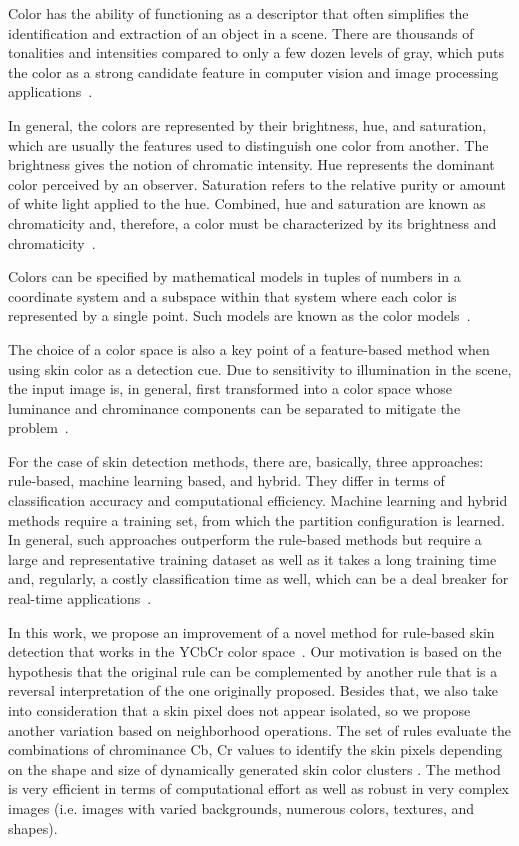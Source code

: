 Color has the ability of functioning as a descriptor that often simplifies the identification and extraction of an object in a scene. There are thousands of tonalities and intensities compared to only a few dozen levels of gray, which puts the color as a strong candidate feature in computer vision and image processing applications~\citep{gonzalez:02}.

In general, the colors are represented by their brightness, hue, and saturation, which are usually the features used to distinguish one color from another. The brightness gives the notion of chromatic intensity. Hue represents the dominant color perceived by an observer. Saturation refers to the relative purity or amount of white light applied to the hue. Combined, hue and saturation are known as chromaticity and, therefore, a color must be characterized by its brightness and chromaticity~\citep{gonzalez:02}.

Colors can be specified by mathematical models in tuples of numbers in a coordinate system and a subspace within that system where each color is represented by a single point. Such models are known as the color models~\citep{gonzalez:02}.

The choice of a color space is also a key point of a feature-based method when using skin color as a detection cue. Due to sensitivity to illumination in the scene, the input image is, in general, first transformed into a color space whose luminance and chrominance components can be separated to mitigate the problem~\citep{vezhnevets:03}.

For the case of skin detection methods, there are, basically, three approaches: rule-based, machine learning based, and hybrid. They differ in terms of classification accuracy and computational efficiency. Machine learning and hybrid methods require a training set, from which the partition configuration is learned. In general, such approaches outperform the rule-based methods but require a large and representative training dataset as well as it takes a long training time and, regularly, a costly classification time as well, which can be a deal breaker for real-time applications~\citep{kakumanu:07,brancati:17}.

In this work, we propose an improvement of a novel method for rule-based skin detection that works in the YCbCr color space~\citep{brancati:17}. Our motivation is based on the hypothesis that the original rule can be complemented by another rule that is a reversal interpretation of the one originally proposed. Besides that, we also take into consideration that a skin pixel does not appear isolated, so we propose another variation based on neighborhood operations. The set of rules evaluate the combinations of chrominance Cb, Cr values to identify the skin pixels depending on the shape and size of dynamically generated skin color clusters \citep{brancati:17}. The method is very efficient in terms of computational effort as well as robust in very complex images (i.e. images with varied backgrounds, numerous colors, textures, and shapes).


